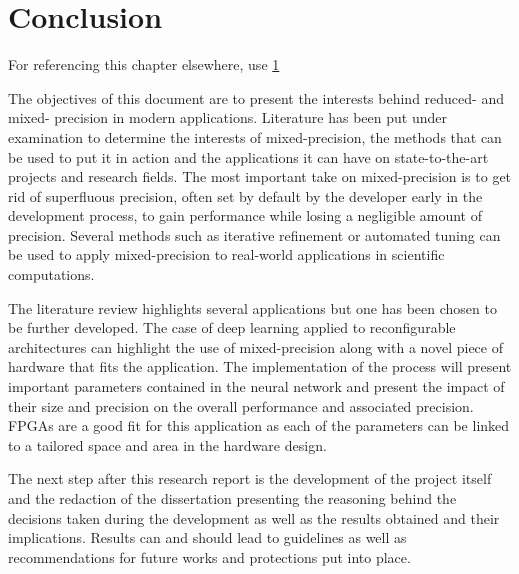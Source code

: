 \chapter{Conclusion}

\label{Chapter6} For referencing this chapter elsewhere, use \ref{Chapter6}


The objectives of this document are to present the interests behind reduced- and mixed- precision in modern applications. Literature has been put under examination to determine the interests of mixed-precision, the methods that can be used to put it in action and the applications it can have on state-to-the-art projects and research fields. The most important take on mixed-precision is to get rid of superfluous precision, often set by default by the developer early in the development process, to gain performance while losing a negligible amount of precision. Several methods such as iterative refinement or automated tuning can be used to apply mixed-precision to real-world applications in scientific computations.

The literature review highlights several applications but one has been chosen to be further developed. The case of deep learning applied to reconfigurable architectures can highlight the use of mixed-precision along with a novel piece of hardware that fits the application. The implementation of the process will present important parameters contained in the neural network and present the impact of their size and precision on the overall performance and associated precision. FPGAs are a good fit for this application as each of the parameters can be linked to a tailored space and area in the hardware design.

The next step after this research report is the development of the project itself and the redaction of the dissertation presenting the reasoning behind the decisions taken during the development as well as the results obtained and their implications. Results can and should lead to guidelines as well as recommendations for future works and protections put into place.
